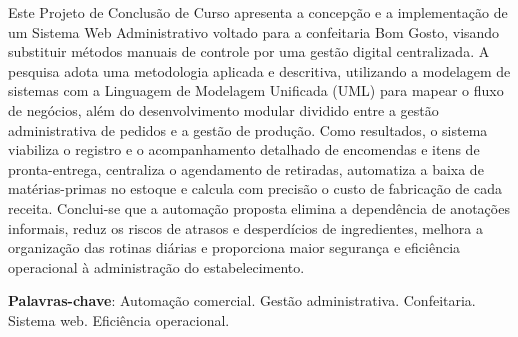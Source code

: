 \begin{resumo}
Este Projeto de Conclusão de Curso apresenta a concepção e a implementação de um Sistema Web Administrativo voltado
para a confeitaria Bom Gosto, visando substituir métodos manuais de controle por uma gestão digital centralizada. 
A pesquisa adota uma metodologia aplicada e descritiva, utilizando a modelagem de sistemas com a Linguagem de Modelagem Unificada (UML)
para mapear o fluxo de negócios, além do desenvolvimento modular dividido entre a gestão administrativa de pedidos 
e a gestão de produção. Como resultados, o sistema viabiliza o registro e o acompanhamento detalhado de encomendas e
itens de pronta-entrega, centraliza o agendamento de retiradas, automatiza a baixa de matérias-primas no estoque e 
calcula com precisão o custo de fabricação de cada receita. Conclui-se que a automação proposta elimina a dependência
de anotações informais, reduz os riscos de atrasos e desperdícios de ingredientes, melhora a organização das rotinas diárias
e proporciona maior segurança e eficiência operacional à administração do estabelecimento.
\vspace{\onelineskip}
\noindent

\textbf{Palavras-chave}: Automação comercial. Gestão administrativa. Confeitaria. Sistema web. Eficiência operacional.

\end{resumo}